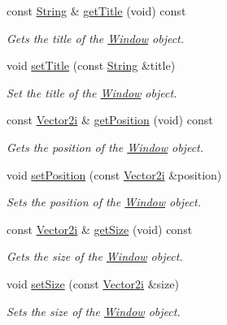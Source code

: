 \begin{DoxyCompactItemize}
const \hyperlink{classsparky_1_1_string}{String} \& \hyperlink{classsparky_1_1_window_a7cb74aed0cf3e49ce5f90783572f4bc8}{get\+Title} (void) const 
\begin{DoxyCompactList}\small\item\em Gets the title of the \hyperlink{classsparky_1_1_window}{Window} object. \end{DoxyCompactList}\item 
void \hyperlink{classsparky_1_1_window_a9ffb992af1550ee0ec4e44e01490f8c0}{set\+Title} (const \hyperlink{classsparky_1_1_string}{String} \&title)
\begin{DoxyCompactList}\small\item\em Set the title of the \hyperlink{classsparky_1_1_window}{Window} object. \end{DoxyCompactList}\item 
const \hyperlink{classsparky_1_1_vector2}{Vector2i} \& \hyperlink{classsparky_1_1_window_aa7307ea00185591b3880f6b0a9b12f99}{get\+Position} (void) const 
\begin{DoxyCompactList}\small\item\em Gets the position of the \hyperlink{classsparky_1_1_window}{Window} object. \end{DoxyCompactList}\item 
void \hyperlink{classsparky_1_1_window_a03b71be9cdc00f14d2c505f9321b51fd}{set\+Position} (const \hyperlink{classsparky_1_1_vector2}{Vector2i} \&position)
\begin{DoxyCompactList}\small\item\em Sets the position of the \hyperlink{classsparky_1_1_window}{Window} object. \end{DoxyCompactList}\item 
const \hyperlink{classsparky_1_1_vector2}{Vector2i} \& \hyperlink{classsparky_1_1_window_ad8156429e7cacd951bc18cb41022239a}{get\+Size} (void) const 
\begin{DoxyCompactList}\small\item\em Gets the size of the \hyperlink{classsparky_1_1_window}{Window} object. \end{DoxyCompactList}\item 
void \hyperlink{classsparky_1_1_window_a339ceddf98cc492435f2fb3f18eecf92}{set\+Size} (const \hyperlink{classsparky_1_1_vector2}{Vector2i} \&size)
\begin{DoxyCompactList}\small\item\em Sets the size of the \hyperlink{classsparky_1_1_window}{Window} object. \end{DoxyCompactList}\item 

\end{DoxyCompactItemize}
